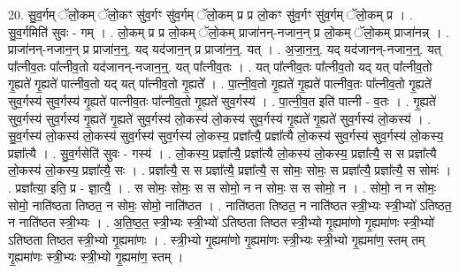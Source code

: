 \documentclass[17pt]{extarticle}
\begin{document}
20. सु॒व॒र्गम् ॅलो॒कम् ॅलो॒कꣳ सु॑व॒र्गꣳ सु॑व॒र्गम् ॅलो॒कम् प्र प्र लो॒कꣳ सु॑व॒र्गꣳ सु॑व॒र्गम् ॅलो॒कम् प्र । . सु॒व॒र्गमिति॑ सुवः - गम् । . लो॒कम् प्र प्र लो॒कम् ॅलो॒कम् प्राजा॑नन्-नजान॒न् प्र लो॒कम् ॅलो॒कम् प्राजा॑नन्न् । . प्राजा॑नन्-नजान॒न् प्र प्राजा॑न॒न्॒. यद् यद॑जान॒न् प्र प्राजा॑न॒न्॒. यत् । . अ॒जा॒न॒न्॒. यद् यद॑जानन्-नजान॒न्॒. यत् पा᳚त्नीव॒तः पा᳚त्नीव॒तो यद॑जानन्-नजान॒न्॒. यत् पा᳚त्नीव॒तः । . यत् पा᳚त्नीव॒तः पा᳚त्नीव॒तो यद् यत् पा᳚त्नीव॒तो गृ॒ह्यते॑ गृ॒ह्यते॑ पात्नीव॒तो यद् यत् पा᳚त्नीव॒तो गृ॒ह्यते᳚ । . पा॒त्नी॒व॒तो गृ॒ह्यते॑ गृ॒ह्यते॑ पात्नीव॒तः पा᳚त्नीव॒तो गृ॒ह्यते॑ सुव॒र्गस्य॑ सुव॒र्गस्य॑ गृ॒ह्यते॑ पात्नीव॒तः पा᳚त्नीव॒तो गृ॒ह्यते॑ सुव॒र्गस्य॑ । . पा॒त्नी॒व॒त इति॑ पात्नी - व॒तः । . गृ॒ह्यते॑ सुव॒र्गस्य॑ सुव॒र्गस्य॑ गृ॒ह्यते॑ गृ॒ह्यते॑ सुव॒र्गस्य॑ लो॒कस्य॑ लो॒कस्य॑ सुव॒र्गस्य॑ गृ॒ह्यते॑ गृ॒ह्यते॑ सुव॒र्गस्य॑ लो॒कस्य॑ । . सु॒व॒र्गस्य॑ लो॒कस्य॑ लो॒कस्य॑ सुव॒र्गस्य॑ सुव॒र्गस्य॑ लो॒कस्य॒ प्रज्ञा᳚त्यै॒ प्रज्ञा᳚त्यै लो॒कस्य॑ सुव॒र्गस्य॑ सुव॒र्गस्य॑ लो॒कस्य॒ प्रज्ञा᳚त्यै । . सु॒व॒र्गसेति॑ सुवः - गस्य॑ । . लो॒कस्य॒ प्रज्ञा᳚त्यै॒ प्रज्ञा᳚त्यै लो॒कस्य॑ लो॒कस्य॒ प्रज्ञा᳚त्यै॒ स स प्रज्ञा᳚त्यै लो॒कस्य॑ लो॒कस्य॒ प्रज्ञा᳚त्यै॒ सः । . प्रज्ञा᳚त्यै॒ स स प्रज्ञा᳚त्यै॒ प्रज्ञा᳚त्यै॒ स सोमः॒ सोमः॒ स प्रज्ञा᳚त्यै॒ प्रज्ञा᳚त्यै॒ स सोमः॑ । . प्रज्ञा᳚त्या॒ इति॒ प्र - ज्ञा॒त्यै॒ । . स सोमः॒ सोमः॒ स स सोमो॒ न न सोमः॒ स स सोमो॒ न । . सोमो॒ न न सोमः॒ सोमो॒ नाति॑ष्ठता तिष्ठत॒ न सोमः॒ सोमो॒ नाति॑ष्ठत । . नाति॑ष्ठता तिष्ठत॒ न नाति॑ष्ठत स्त्री॒भ्यः स्त्री॒भ्यो॑ ऽतिष्ठत॒ न नाति॑ष्ठत स्त्री॒भ्यः । . अ॒ति॒ष्ठ॒त॒ स्त्री॒भ्यः स्त्री॒भ्यो॑ ऽतिष्ठता तिष्ठत स्त्री॒भ्यो गृ॒ह्यमा॑णो गृ॒ह्यमा॑णः स्त्री॒भ्यो॑ ऽतिष्ठता तिष्ठत स्त्री॒भ्यो गृ॒ह्यमा॑णः । . स्त्री॒भ्यो गृ॒ह्यमा॑णो गृ॒ह्यमा॑णः स्त्री॒भ्यः स्त्री॒भ्यो गृ॒ह्यमा॑ण॒ स्तम् तम् गृ॒ह्यमा॑णः स्त्री॒भ्यः स्त्री॒भ्यो गृ॒ह्यमा॑ण॒ स्तम् । \newline
\end{document}
